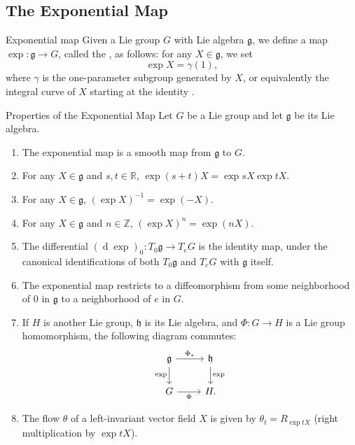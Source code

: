 \documentclass[../main.tex]{subfiles}
\begin{document}
\subsection{The Exponential Map}

\begin{definition}{Exponential map}{}
    Given a Lie group \(G\) with Lie algebra \(\mathfrak g\), we define a map \(\operatorname{exp}\colon\mathfrak g\to G\), called the , as follows: for any \(X\in\mathfrak g\), we set
\[
\operatorname{exp}X=\gamma(1),
\]
where \(\gamma\) is the one-parameter subgroup generated by \(X\), or equivalently the integral curve of \(X\) starting at the identity . 
\end{definition}

\begin{proposition}{Properties of the Exponential Map}{}
Let $G$ be a Lie group and let $\mathfrak{g}$ be its Lie algebra.
\begin{enumerate}
    \item[(a)] The exponential map is a smooth map from $\mathfrak{g}$ to $G$.
    \item[(b)] For any $X \in \mathfrak{g}$ and $s, t \in \mathbb{R}$, $\exp(s+t)X = \exp sX \exp tX$.
    \item[(c)] For any $X \in \mathfrak{g}$, $(\exp X)^{-1} = \exp(-X)$.
    \item[(d)] For any $X \in \mathfrak{g}$ and $n \in \mathbb{Z}$, $(\exp X)^n = \exp(nX)$.
    \item[(e)] The differential $(\operatorname{d}\exp)_0 \colon T_0\mathfrak{g} \to T_eG$ is the identity map, under the canonical identifications of both $T_0\mathfrak{g}$ and $T_eG$ with $\mathfrak{g}$ itself.
    \item[(f)] The exponential map restricts to a diffeomorphism from some neighborhood of $0$ in $\mathfrak{g}$ to a neighborhood of $e$ in $G$.
    \item[(g)] If $H$ is another Lie group, $\mathfrak{h}$ is its Lie algebra, and $\Phi \colon G \to H$ is a Lie group homomorphism, the following diagram commutes:
    \begin{equation}
    \begin{tikzcd}
    \mathfrak{g} \arrow[r, "\Phi_*"] \arrow[d, "\exp"'] & \mathfrak{h} \arrow[d, "\exp"] \\
    G \arrow[r, "\Phi"'] & H.
    \end{tikzcd}
    \end{equation}
    \item[(h)] The flow $\theta$ of a left-invariant vector field $X$ is given by $\theta_t = R_{\exp tX}$ (right multiplication by $\exp tX$).
\end{enumerate}
\end{proposition}
\end{document}
